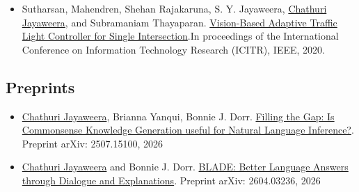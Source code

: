 \begin{itemize}
    \item Sutharsan, Mahendren, Shehan Rajakaruna, S. Y. Jayaweera, \underline{Chathuri Jayaweera}, and Subramaniam Thayaparan. \href{https://ieeexplore.ieee.org/abstract/document/9310872}{Vision-Based Adaptive Traffic Light Controller for Single Intersection}.In proceedings of the International Conference on Information Technology Research (ICITR), IEEE, 2020.

\end{itemize}
\vspace{-0.3in}




\subsection*{Preprints}
\begin{itemize}
    \item \underline{Chathuri Jayaweera}, Brianna Yanqui, Bonnie J. Dorr. \href{https://arxiv.org/abs/2507.15100}{Filling the Gap: Is Commonsense Knowledge Generation useful for Natural Language Inference?}. Preprint arXiv: 2507.15100, 2026
    
    \item \underline{Chathuri Jayaweera} and Bonnie J. Dorr. \href{https://doi.org/10.5281/zenodo.18490000}{BLADE: Better Language Answers through Dialogue and Explanations}. Preprint arXiv: 2604.03236, 2026
\end{itemize}
